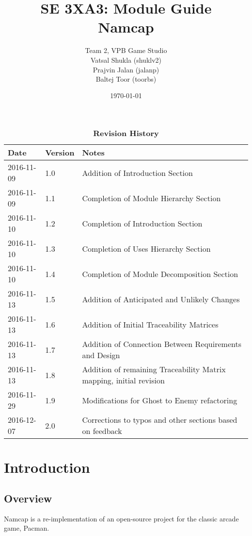 \documentclass[12pt, titlepage]{article}
\title{SE 3XA3: Module Guide\\Namcap}
\author{Team 2, VPB Game Studio
		\\ Vatsal Shukla (shuklv2)
		\\ Prajvin Jalan (jalanp)
		\\ Baltej Toor (toorbs)
}
\date{\today}
\begin{document}
\maketitle

\tableofcontents
\listoftables
\listoffigures

\begin{table}[h]
\caption{\bf Revision History}
\begin{tabularx}{\textwidth}{p{3cm}p{2cm}X}
\toprule {\bf Date} & {\bf Version} & {\bf Notes}\\
\midrule
2016-11-09 & 1.0 & Addition of Introduction Section\\
2016-11-09 & 1.1 & Completion of Module Hierarchy Section\\
2016-11-10 & 1.2 & Completion of Introduction Section\\
2016-11-10 & 1.3 & Completion of Uses Hierarchy Section\\
2016-11-10 & 1.4 & Completion of Module Decomposition Section\\
2016-11-13 & 1.5 & Addition of Anticipated and Unlikely Changes\\
2016-11-13 & 1.6 & Addition of Initial Traceability Matrices\\
2016-11-13 & 1.7 & Addition of Connection Between Requirements and Design\\
2016-11-13 & 1.8 & Addition of remaining Traceability Matrix mapping, initial revision\\
2016-11-29 & 1.9 & Modifications for Ghost to Enemy refactoring\\
2016-12-07 & 2.0 & Corrections to typos and other sections based on feedback\\
\bottomrule
\end{tabularx}
\end{table}

\newpage


\section{Introduction}

\subsection{Overview}
Namcap is a re-implementation of an open-source project for the classic arcade game, Pacman.

\end{document}
